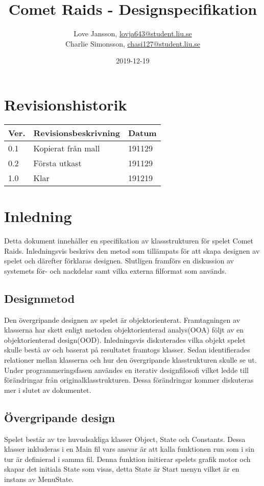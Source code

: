 \documentclass{TDP005mall}
\author{Love Jansson, \url{lovja643@student.liu.se}\\
  Charlie Simonsson, \url{chasi127@student.liu.se}}
\title{Comet Raids - Designspecifikation}
\date{2019-12-19}
\begin{document}
\projectpage
\section{Revisionshistorik}
\begin{table}[!h]
\begin{tabularx}{\linewidth}{|l|X|l|}
\hline
Ver. & Revisionsbeskrivning & Datum \\\hline
0.1 & Kopierat från mall & 191129 \\\hline
0.2 & Första utkast & 191129 \\\hline
1.0 & Klar & 191219 \\\hline
\end{tabularx}
\end{table}

\tableofcontents

\pagebreak

\section{Inledning}
Detta dokument innehåller en specifikation av klassstrukturen för
spelet Comet Raids. Inledningsvis beskrivs den metod som tillämpats för att skapa
designen av spelet och därefter förklaras designen. Slutligen framförs en 
diskussion av systemets för- och nackdelar samt vilka externa filformat som används.\\

\subsection{Designmetod}
Den övergripande designen av spelet är objektorienterat.
Framtagningen av klasserna har skett enligt metoden objektorienterad analys(OOA)
följt av en objektorienterad design(OOD). Inledningsvis diskuterades vilka
objekt spelet skulle bestå av och baserat på resultatet framtogs klasser. Sedan
identifierades relationer mellan klasserna och hur den övergripande
klasstrukturen skulle se ut. Under programmeringsfasen användes en 
iterativ designfilosofi vilket ledde till förändringar från originalklasstrukturen.
Dessa förändringar kommer diskuteras mer i slutet av dokumentet.

\subsection{Övergripande design}
Spelet består av tre huvudsakliga klasser Object, State och Constants. Dessa klasser
inkluderas i en Main fil vars ansvar är att kalla funktionen run som i sin tur är
definierad i samma fil. Denna funktion initierar spelets grafik motor och skapar det
initiala State som visas, detta State är Start menyn vilket är en instans av MenuState.  
\end{document}
